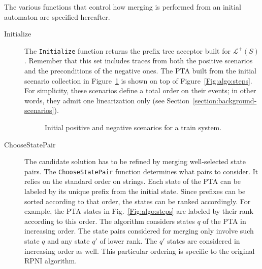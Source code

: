 The various functions that control how merging is performed from an initial automaton are specified hereafter. 

\begin{description}

\item[Initialize] The \texttt{Initialize} function returns the prefix tree acceptor built for $\mathcal{L}^+(S)$. Remember that this set includes traces from both the positive scenarios and the preconditions of the negative ones. The PTA built from the initial scenario collection in Figure~\ref{Fig:init:scen} is shown on top of Figure~\ref{Fig:algo:steps}. For simplicity, these scenarios define a total order on their events; in other words, they admit one linearization only (see Section~\ref{section:background-scenarios}). 

\begin{figure}
\centering
{}
\caption{Initial positive and negative scenarios for a train system\label{Fig:init:scen}.}
\end{figure}

\item[ChooseStatePair] The candidate solution has to be refined by merging well-selected state pairs. The \texttt{ChooseStatePair} function determines what pairs to consider. It relies on the standard order on strings. Each state of the PTA can be labeled by its unique prefix from the initial state. Since prefixes can be sorted according to that order, the states can be ranked accordingly. For example, the PTA states in Fig.~\ref{Fig:algo:steps} are labeled by their rank according to this order. The algorithm considers states $q$ of the PTA in increasing order. The state pairs considered for merging only involve such state $q$ and any state $q'$ of lower rank. The $q'$ states are considered in increasing order as well. This particular ordering is specific to the original RPNI algorithm.


\end{description}
